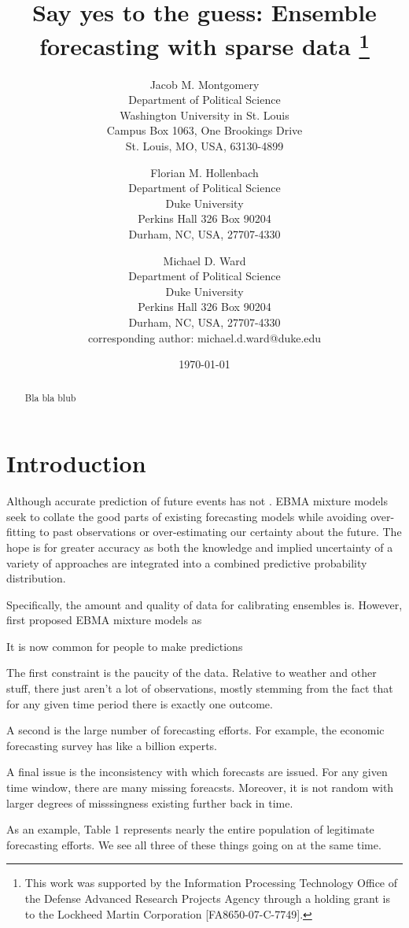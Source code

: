 \documentclass[12pt,fullpage,endnotes]{article}
\title{Say yes to the guess: Ensemble forecasting with sparse data \thanks{This work was supported by the Information Processing Technology Office of the
    Defense Advanced Research Projects Agency through a
    holding grant is to the Lockheed Martin Corporation [FA8650-07-C-7749].}}
\author{
Jacob M. Montgomery\\
	Department of Political Science\\
	Washington University in St. Louis\\
	Campus Box 1063, One Brookings Drive\\
	St. Louis, MO, USA, 63130-4899 
	\and
Florian M. Hollenbach  \\
	Department of Political Science\\
	Duke University\\
	Perkins Hall 326 Box 90204\\
	Durham, NC, USA, 27707-4330
	\and
Michael D. Ward\\
	Department of Political Science\\
	Duke University\\
	Perkins Hall 326 Box 90204\\
	Durham, NC, USA, 27707-4330\\
	corresponding author: michael.d.ward@duke.edu
}
\date{\today}
\begin{document}
\maketitle
\thispagestyle{empty}
\clearpage
\pagestyle{myheadings}
\newpage

\thispagestyle{empty}


\begin{abstract}
 Bla bla blub
\end{abstract}



\setcounter{page}{1}

\section{Introduction}

Although accurate prediction of future events has not .  EBMA mixture
models seek to collate the good parts of existing forecasting models
while avoiding over-fitting to past observations or over-estimating
our certainty about the future.  The hope is for greater accuracy as
both the knowledge and implied uncertainty of a variety of approaches
are integrated into a combined predictive probability distribution.


Specifically, the amount and quality of data for calibrating ensembles
is.  However, \citet{Raftery:2005} first proposed EBMA mixture models
as

It is now common for people to make predictions





The first constraint is the paucity of the data.  Relative to weather
and other stuff, there just aren't a lot of observations, mostly
stemming from the fact that for any given time period there is exactly
one outcome.

A second is the large number of forecasting efforts.  For example, the
economic forecasting survey has like a billion experts.

A final issue is the inconsistency with which forecasts are
issued. For any given time window, there are many missing foreacsts.
Moreover, it is not random with larger degrees of misssingness
existing further back in time.

As an example, Table 1 represents nearly the entire population of
legitimate forecasting efforts.  We see all three of these things
going on at the same time.
\end{document}
